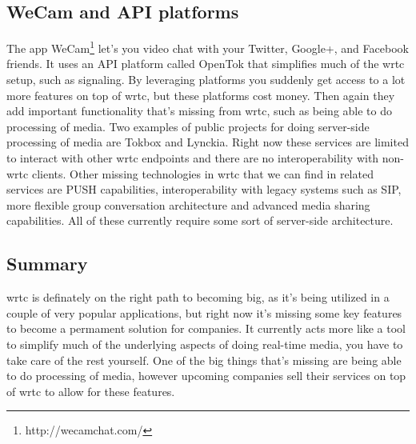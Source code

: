 \subsection{WeCam and API platforms}
The app WeCam\footnote{http://wecamchat.com/} let's you video chat with your Twitter, Google+, and Facebook friends. It uses an API platform called OpenTok that simplifies much of the \gls{wrtc} setup, such as signaling. By leveraging platforms you suddenly get access to a lot more features on top of \gls{wrtc}, but these platforms cost money. Then again they add important functionality that's missing from \gls{wrtc}, such as being able to do processing of media. Two examples of public projects for doing server-side processing of media are Tokbox and Lynckia. Right now these services are limited to interact with other \gls{wrtc} endpoints and there are no interoperability with non-\gls{wrtc} clients. Other missing technologies in \gls{wrtc} that we can find in related services are PUSH capabilities, interoperability with legacy systems such as SIP, more flexible group conversation architecture and advanced media sharing capabilities. All of these currently require some sort of server-side architecture.

\subsection*{Summary}
\gls{wrtc} is definately on the right path to becoming big, as it's being utilized in a couple of very popular applications, but right now it's missing some key features to become a permament solution for companies. It currently acts more like a tool to simplify much of the underlying aspects of doing real-time media, you have to take care of the rest yourself. One of the big things that's missing are being able to do processing of media, however upcoming companies sell their services on top of \gls{wrtc} to allow for these features.